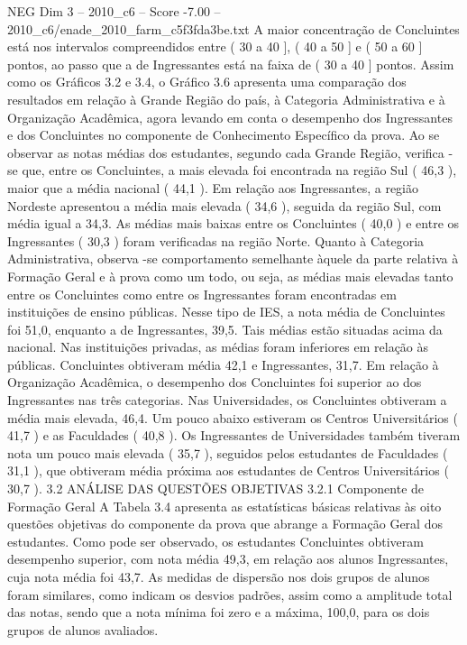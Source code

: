 \begin{textsample}{NEG Dim 3 – 2010\_c6 – Score -7.00 – 2010\_c6/enade\_2010\_farm\_c5f3fda3be.txt}
A maior concentração de Concluintes está nos intervalos compreendidos entre ( 30 a 40 ], ( 40 a 50 ] e ( 50 a 60 ] pontos, ao passo que a de Ingressantes está na faixa de ( 30 a 40 ] pontos.
Assim como os Gráficos 3.2 e 3.4, o Gráfico 3.6 apresenta uma comparação dos resultados em relação à Grande Região do país, à Categoria Administrativa e à Organização Acadêmica, agora levando em conta o desempenho dos Ingressantes e dos Concluintes no componente de Conhecimento Específico da prova.
Ao se observar as notas médias dos estudantes, segundo cada Grande Região, verifica -se que, entre os Concluintes, a mais elevada foi encontrada na região Sul ( 46,3 ), maior que a média nacional ( 44,1 ).
Em relação aos Ingressantes, a região Nordeste apresentou a média mais elevada ( 34,6 ), seguida da região Sul, com média igual a 34,3.
As médias mais baixas entre os Concluintes ( 40,0 ) e entre os Ingressantes ( 30,3 ) foram verificadas na região Norte.
Quanto à Categoria Administrativa, observa -se comportamento semelhante àquele da parte relativa à Formação Geral e à prova como um todo, ou seja, as médias mais elevadas tanto entre os Concluintes como entre os Ingressantes foram encontradas em instituições de ensino públicas.
Nesse tipo de IES, a nota média de Concluintes foi 51,0, enquanto a de Ingressantes, 39,5.
Tais médias estão situadas acima da nacional.
Nas instituições privadas, as médias foram inferiores em relação às públicas.
Concluintes obtiveram média 42,1 e Ingressantes, 31,7.
Em relação à Organização Acadêmica, o desempenho dos Concluintes foi superior ao dos Ingressantes nas três categorias.
Nas Universidades, os Concluintes obtiveram a média mais elevada, 46,4.
Um pouco abaixo estiveram os Centros Universitários ( 41,7 ) e as Faculdades ( 40,8 ).
Os Ingressantes de Universidades também tiveram nota um pouco mais elevada ( 35,7 ), seguidos pelos estudantes de Faculdades ( 31,1 ), que obtiveram média próxima aos estudantes de Centros Universitários ( 30,7 ). 3.2 ANÁLISE DAS QUESTÕES OBJETIVAS 3.2.1 Componente de Formação Geral A Tabela 3.4 apresenta as estatísticas básicas relativas às oito questões objetivas do componente da prova que abrange a Formação Geral dos estudantes.
Como pode ser observado, os estudantes Concluintes obtiveram desempenho superior, com nota média 49,3, em relação aos alunos Ingressantes, cuja nota média foi 43,7.
As medidas de dispersão nos dois grupos de alunos foram similares, como indicam os desvios padrões, assim como a amplitude total das notas, sendo que a nota mínima foi zero e a máxima, 100,0, para os dois grupos de alunos avaliados.

\end{textsample}
